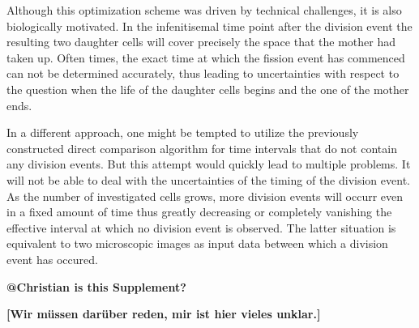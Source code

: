 \documentclass{article}
\begin{document}
Although this optimization scheme was driven by technical challenges, it is also biologically
motivated.
In the infenitisemal time point after the division event the resulting two daughter cells will cover
precisely the space that the mother had taken up.
Often times, the exact time at which the fission event has commenced can not be determined
accurately, thus leading to uncertainties with respect to the question when the life of the daughter
cells begins and the one of the mother ends.

In a different approach, one might be tempted to utilize the previously constructed direct
comparison algorithm for time intervals that do not contain any division events.
But this attempt would quickly lead to multiple problems.
It will not be able to deal with the uncertainties of the timing of the division event.
As the number of investigated cells grows, more division events will occurr even in a fixed
amount of time thus greatly decreasing or completely vanishing the effective interval at which no
division event is observed.
The latter situation is equivalent to two microscopic images as input data between which a division
event has occured.

\textbf{@Christian is this Supplement?}

\textbf{[Wir müssen darüber reden, mir ist hier vieles unklar.]}
\end{document}

